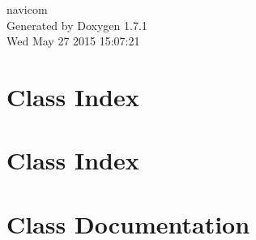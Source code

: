 \documentclass[a4paper]{article}
\begin{document}
\hypersetup{pageanchor=false}
\begin{titlepage}
\vspace*{7cm}
\begin{center}
{\Large navicom }\\
\vspace*{1cm}
{\large Generated by Doxygen 1.7.1}\\
\vspace*{0.5cm}
{\small Wed May 27 2015 15:07:21}\\
\end{center}
\end{titlepage}
\tableofcontents
{}
\hypersetup{pageanchor=true}
\section{Class Index}

\section{Class Index}

\section{Class Documentation}





\printindex
\end{document}
